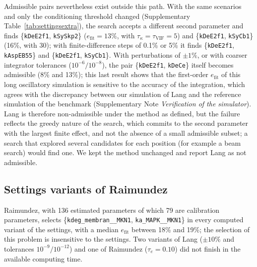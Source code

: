 Admissible pairs nevertheless exist outside this path. With the same scenarios and only the conditioning threshold changed (Supplementary Table~\ref{tab:settingsextra}), the search accepts a different second parameter and finds \{\texttt{kDeE2f1}, \texttt{kSySkp2}\} ($e_{\mathrm{fit}}=13\%$, with $\tau_\kappa=\tau_{\mathrm{VIF}}=5$) and \{\texttt{kDeE2f1}, \texttt{kSyCb1}\} (16\%, with 30); with finite-difference steps of 0.1\% or 5\% it finds \{\texttt{kDeE2f1}, \texttt{kAspEB55}\} and \{\texttt{kDeE2f1}, \texttt{kSyCb1}\}. With perturbations of $\pm1\%$, or with coarser integrator tolerances ($10^{-6}/10^{-8}$), the pair \{\texttt{kDeE2f1}, \texttt{kDeCe}\} itself becomes admissible (8\% and 13\%); this last result shows that the first-order $e_{\mathrm{fit}}$ of this long oscillatory simulation is sensitive to the accuracy of the integration, which agrees with the discrepancy between our simulation of Lang and the reference simulation of the benchmark (Supplementary Note \emph{Verification of the simulator}). Lang is therefore non-admissible under the method as defined, but the failure reflects the greedy nature of the search, which commits to the second parameter with the largest finite effect, and not the absence of a small admissible subset; a search that explored several candidates for each position (for example a beam search) would find one. We kept the method unchanged and report Lang as not admissible.

\subsection*{Settings variants of Raimundez}
Raimundez, with 136 estimated parameters of which 79 are calibration parameters, selects \{\texttt{kdeg\_membran\_\_MKN1}, \texttt{ka\_MAPK\_\_MKN1}\} in every computed variant of the settings, with a median $e_{\mathrm{fit}}$ between 18\% and 19\%; the selection of this problem is insensitive to the settings. Two variants of Lang ($\pm10\%$ and tolerances $10^{-9}/10^{-12}$) and one of Raimundez ($\tau_e=0.10$) did not finish in the available computing time.

{\small

}
